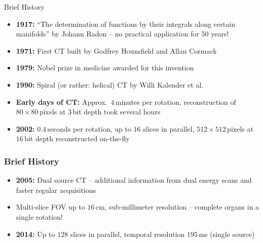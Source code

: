 \begin{frame}{Brief History}

	\begin{itemize}
		\setlength\itemsep{0.3cm}
		\item \textcolor{faublue}{\textbf{1917:}} ``The determination of functions by their integrals along certain manifolds'' by Johann Radon -- no practical application for 50 years!
		\item \textcolor{faublue}{\textbf{1971:}} First CT built by Godfrey Hounsfield and Allan Cormack
		\item \textcolor{faublue}{\textbf{1979:}} Nobel prize in medicine awarded for this invention
		\item \textcolor{faublue}{\textbf{1990:}} Spiral (or rather: helical) CT by Willi Kalender et al.
		\item \textcolor{faublue}{\textbf{Early days of CT:}}\newline{} Approx.~$4$\,minutes per rotation, reconstruction of $80\times80$\,pixels at $3$\,bit depth took several hours
		\item \textcolor{faublue}{\textbf{2002:}} $0.4$\,seconds per rotation, up to $16$ slices in parallel, $512\times512$\,pixels at $16$\,bit depth reconstructed on-the-fly

	\end{itemize}

\end{frame}

\begin{frame}
	\frametitle{Brief History}

	\begin{itemize}
		\setlength\itemsep{0.3cm}
		\item \textcolor{faublue}{\textbf{2005:}} Dual source CT -- additional information from dual energy scans and faster regular acquisitions
		\item Multi-slice FOV up to $16$\,cm, sub-millimeter resolution -- complete organs in a single rotation!
		\item \textcolor{faublue}{\textbf{2014:}} Up to $128$ slices in parallel, temporal resolution $195$\,ms (single source)

	\end{itemize}

\end{frame}


